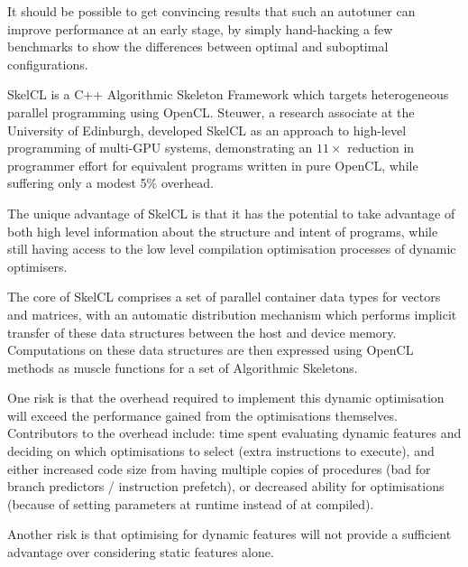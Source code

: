 



It should be possible to get convincing results that such an autotuner
can improve performance at an early stage, by simply hand-hacking a
few benchmarks to show the differences between optimal and suboptimal
configurations.

SkelCL is a C++ Algorithmic Skeleton Framework which targets
heterogeneous parallel programming using OpenCL. Steuwer, a research
associate at the University of Edinburgh, developed SkelCL as an
approach to high-level programming of multi-GPU systems, demonstrating
an $11\times$ reduction in programmer effort for equivalent programs
written in pure OpenCL, while suffering only a modest 5\% overhead.

The unique advantage of SkelCL is that it has the potential to take
advantage of both high level information about the structure and
intent of programs, while still having access to the low level
compilation optimisation processes of dynamic optimisers.

The core of SkelCL comprises a set of parallel container data types
for vectors and matrices, with an automatic distribution mechanism
which performs implicit transfer of these data structures between the
host and device memory. Computations on these data structures are then
expressed using OpenCL methods as muscle functions for a set of
Algorithmic Skeletons.

One risk is that the overhead required to implement this dynamic
optimisation will exceed the performance gained from the optimisations
themselves. Contributors to the overhead include: time spent
evaluating dynamic features and deciding on which optimisations to
select (extra instructions to execute), and either increased code size
from having multiple copies of procedures (bad for branch predictors /
instruction prefetch), or decreased ability for optimisations (because
of setting parameters at runtime instead of at compiled).

Another risk is that optimising for dynamic features will not provide
a sufficient advantage over considering static features alone.


